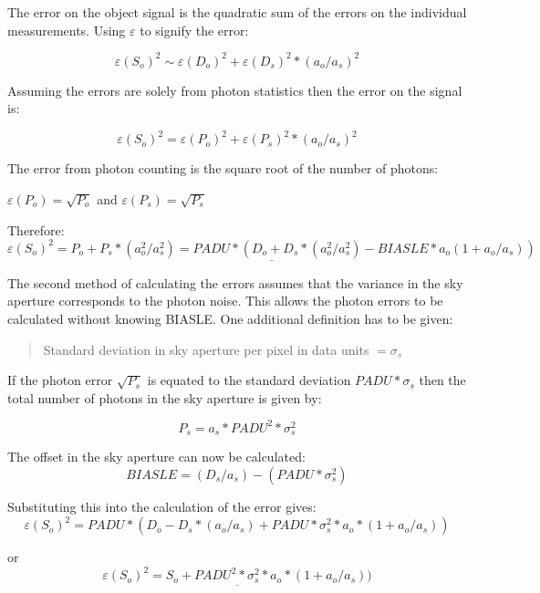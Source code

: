 \documentclass[twoside,11pt,nolof]{starlink}
\begin{document}
The error on the object signal is the quadratic sum of the errors on the
individual measurements. Using $\varepsilon$ to signify the error:

\[\varepsilon( S_o )^2 \sim \varepsilon( D_o )^2 + \varepsilon( D_s )^2 *
( a_o / a_s )^2\]

Assuming the errors are solely from photon statistics then the error on
the signal is:

\[\varepsilon( S_o )^2 = \varepsilon( P_o )^2 + \varepsilon( P_s )^2 *
( a_o / a_s )^2\]

The error from photon counting is the square root of the number of photons:

\begin{center}
$\varepsilon( P_o ) = \sqrt{ P_o }$ and $\varepsilon( P_s ) = \sqrt{ P_s }$
\end{center}

Therefore:
\begin{equation}\underline{
\varepsilon( S_o )^2 = P_o + P_s * ( a_o^2 / a_s^2 )
                      = PADU * ( D_o + D_s *( a_o^2 / a_s^2 ) -
                        BIASLE * a_o ( 1 + a_o / a_s ) )}\end{equation}


The second method of calculating the errors assumes that the variance in
the sky aperture corresponds to the photon noise. This allows the photon
errors to be calculated without knowing BIASLE. One additional definition
has to be given:

\begin{quote}
Standard deviation in sky aperture per pixel in data units $=\sigma_s$
\end{quote}

If the photon error $\sqrt{P_s}$ is equated to the standard deviation
$PADU * \sigma_s$ then the total number of photons in the sky aperture is
given by:

\[P_s = a_s * PADU^2 * \sigma_s^2\]

The offset in the sky aperture can now be calculated:
\[BIASLE = ( D_s / a_s ) - ( PADU * \sigma_s^2 )\]

Substituting this into the calculation of the error gives:
\[\varepsilon( S_o )^2 = PADU * ( D_o - D_s * ( a_o / a_s ) +
                         PADU * \sigma_s^2 * a_o * ( 1 + a_o / a_s ) )\]

or
\begin{equation}\underline{
\varepsilon( S_o )^2 = S_o + PADU^2 * \sigma_s^2 * a_o * ( 1 + a_o / a_s ) )
}\end{equation}
\end{document}

